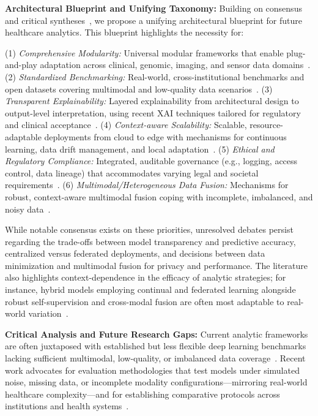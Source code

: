 \documentclass[sigconf]{acmart}
\begin{document}
\textbf{Architectural Blueprint and Unifying Taxonomy:} Building on consensus and critical syntheses~\cite{ref37,ref44,ref45,ref50,ref61,ref65,ref70,ref78,ref84,ref90}, we propose a unifying architectural blueprint for future healthcare analytics. This blueprint highlights the necessity for:

(1) \textit{Comprehensive Modularity:} Universal modular frameworks that enable plug-and-play adaptation across clinical, genomic, imaging, and sensor data domains~\cite{ref30, ref84}.  
(2) \textit{Standardized Benchmarking:} Real-world, cross-institutional benchmarks and open datasets covering multimodal and low-quality data scenarios~\cite{ref44,ref45,ref78,ref84}.  
(3) \textit{Transparent Explainability:} Layered explainability from architectural design to output-level interpretation, using recent XAI techniques tailored for regulatory and clinical acceptance~\cite{ref11,ref70,ref84}.  
(4) \textit{Context-aware Scalability:} Scalable, resource-adaptable deployments from cloud to edge with mechanisms for continuous learning, data drift management, and local adaptation~\cite{ref36,ref43,ref50,ref79,ref106,ref107}.  
(5) \textit{Ethical and Regulatory Compliance:} Integrated, auditable governance (e.g., logging, access control, data lineage) that accommodates varying legal and societal requirements~\cite{ref65,ref70,ref84}.  
(6) \textit{Multimodal/Heterogeneous Data Fusion:} Mechanisms for robust, context-aware multimodal fusion coping with incomplete, imbalanced, and noisy data~\cite{ref37,ref76,ref78,ref104,ref105,ref106}.  

While notable consensus exists on these priorities, unresolved debates persist regarding the trade-offs between model transparency and predictive accuracy, centralized versus federated deployments, and decisions between data minimization and multimodal fusion for privacy and performance. The literature also highlights context-dependence in the efficacy of analytic strategies; for instance, hybrid models employing continual and federated learning alongside robust self-supervision and cross-modal fusion are often most adaptable to real-world variation~\cite{ref36,ref37,ref43,ref78,ref79,ref84,ref90,ref104,ref105,ref106,ref107}.

\textbf{Critical Analysis and Future Research Gaps:} Current analytic frameworks are often juxtaposed with established but less flexible deep learning benchmarks lacking sufficient multimodal, low-quality, or imbalanced data coverage~\cite{ref44,ref45,ref78}. Recent work advocates for evaluation methodologies that test models under simulated noise, missing data, or incomplete modality configurations---mirroring real-world healthcare complexity---and for establishing comparative protocols across institutions and health systems~\cite{ref44,ref45,ref50,ref78,ref84,ref106}.
\end{document}
